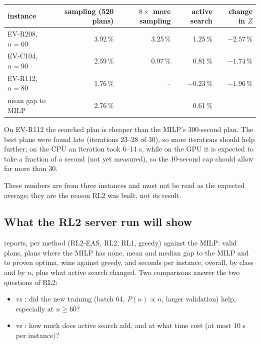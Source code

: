 \begin{center}\small
\begin{tabular}{@{}lrrrr@{}}
\toprule
instance & sampling (520 plans) & $8\times$ more sampling & active search & change in $Z$ \\
\midrule
EV-R208, $n=60$ & 3.92\,\% & 3.25\,\% & 1.25\,\% & $-2.57$\,\% \\
EV-C104, $n=90$ & 2.59\,\% & 0.97\,\% & 0.81\,\% & $-1.74$\,\% \\
EV-R112, $n=80$ & 1.76\,\% & -- & $-0.23$\,\% & $-1.96$\,\% \\
\midrule
mean gap to MILP & 2.76\,\% & & 0.61\,\% & \\
\bottomrule
\end{tabular}
\end{center}
On EV-R112 the searched plan is cheaper than the MILP's 300-second plan. The best plans were found late (iterations 23--28 of 30), so more iterations should help further; on the CPU an iteration took 6--14 s, while on the GPU it is expected to take a fraction of a second (not yet measured), so the 10-second cap should allow far more than 30.

These numbers are from three instances and must not be read as the expected average; they are the reason RL2 was built, not its result.

\subsection{What the RL2 server run will show}

 reports, per method (RL2-EAS, RL2, RL1, greedy) against the MILP: valid plans, plans where the MILP has none, mean and median gap to the MILP and to proven optima, wins against greedy, and seconds per instance, overall, by class and by $n$, plus what active search changed. Two comparisons answer the two questions of RL2:
\begin{itemize}
  \item {} vs : did the new training (batch 64, $P(n)\propto n$, larger validation) help, especially at $n\ge60$?
  \item {} vs : how much does active search add, and at what time cost (at most 10 s per instance)?
\end{itemize}
